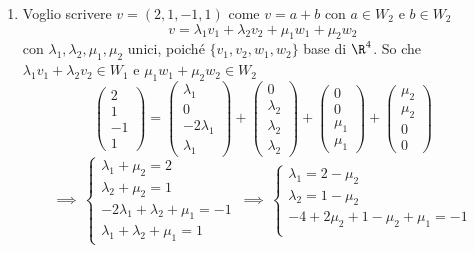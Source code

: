 {\begin{enumerate}
        $\implies$ $R^4=W_1 \oplus W_2$ e $\{v_1, v_2, w_1, w_2\}$ è base di $\R^4$.
        \item Voglio scrivere $v=(2, 1, -1, 1)$ come $v=a+b$ con $a \in W_2$ e $b \in W_2$
        \[
        v=\lambda_1 v_1+ \lambda_2 v_2+ \mu_1 w_1 + \mu_2 w_2\] con $\lambda_1, \lambda_2, \mu_1, \mu_2$ unici, poiché $\{v_1, v_2, w_1, w_2\}$ base di $\R^4$. So che $\lambda_1 v_1 + \lambda_2 v_2 \in W_1$ e $\mu_1 w_1 + \mu_2 w_2 \in W_2$
        \[
            \begin{pmatrix}
                2\\ 1\\ -1 \\ 1
            \end{pmatrix} = \begin{pmatrix}
                \lambda_1\\ 0\\ -2\lambda_1\\ \lambda_1
            \end{pmatrix} + \begin{pmatrix}
                0\\ \lambda_2\\ \lambda_2\\ \lambda_2
            \end{pmatrix} + \begin{pmatrix}
                0\\ 0\\ \mu_1\\ \mu_1
            \end{pmatrix} + \begin{pmatrix}
                \mu_2\\ \mu_2\\ 0\\ 0
            \end{pmatrix}
        \] 
        \[
            \implies\,\begin{cases}
                \lambda_1+\mu_2=2\\
                \lambda_2+\mu_2=1\\
                -2\lambda_1+\lambda_2+\mu_1=-1\\
                \lambda_1+\lambda_2+\mu_1=1
            \end{cases} \,\implies\, \begin{cases}
                \lambda_1=2-\mu_2\\
                \lambda_2=1-\mu_2\\
                -4+2\mu_2+1-\mu_2+\mu_1=-1\\

\end{cases}\]
\end{enumerate}}
